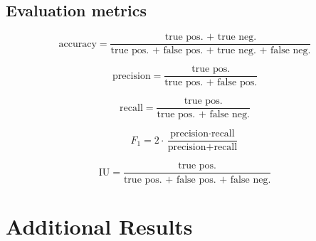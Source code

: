 \subsection{Evaluation metrics}

$$ \text{accuracy} = \frac{\text{true pos. + true neg.}}{\text{true pos. + false pos. + true neg. + false neg.}}$$

$$\text{precision} = \frac{\text{true pos.}}{\text{true pos. + false pos.}}$$

$$\text{recall} = \frac{\text{true pos.}}{\text{true pos. + false neg.}}$$

$$F_1 = 2 \cdot \frac{\text{precision} \cdot \text{recall}}{\text{precision}+\text{recall}}$$

$$ \text{IU} = \frac{\text{true pos.}}{\text{true pos. + false pos. + false neg.}}$$


\section{Additional Results}

